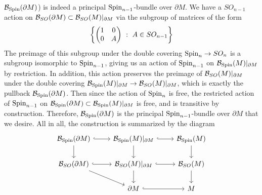 $\mathcal{B}_{\mathrm{Spin}}(\partial M)$) is indeed a principal $\mathrm{Spin}_{n-1}$-bundle over
$\partial M$. We have a $SO_{n-1}$ action on
$\mathcal{B}_{SO}(\partial M) \subset \mathcal{B}_{SO}(M)\vert_{\partial M}$ via the subgroup of
matrices of the form
\[
\left\lbrace \begin{pmatrix}
1 & 0 \\
0 & A
\end{pmatrix} ~ : ~ A \in SO_{n-1} \right\rbrace
\]
The preimage of this subgroup under the double covering $\mathrm{Spin}_n \to SO_n$ is
a subgroup isomorphic to $\mathrm{Spin}_{n-1}$, giving us an action of $\mathrm{Spin}_{n-1}$ on
$\mathcal{B}_{\mathrm{Spin}}(M)\vert_{\partial M}$ by restriction. In addition, this action
preserves the preimage of $\mathcal{B}_{SO}(M)\vert_{\partial M}$ under the double
covering $\mathcal{B}_{\mathrm{Spin}}(M)\vert_{\partial M} \to \mathcal{B}_{SO}(M)\vert_{\partial M}$,
which is exactly the pullback $\mathcal{B}_{\mathrm{Spin}}(\partial M)$. Then since the
action of $\mathrm{Spin}_n$ is free, the restricted action of $\mathrm{Spin}_{n-1}$ on
$\mathcal{B}_{\mathrm{Spin}}(\partial M) \subset \mathcal{B}_{\mathrm{Spin}}(M)\vert_{\partial M}$ is
free, and is transitive by construction. Therefore, $\mathcal{B}_{\mathrm{Spin}}(\partial M)$
is the principal $\mathrm{Spin}_{n-1}$-bundle over $\partial M$ that we desire. All in
all, the construction is summarized by the diagram
\[\begin{tikzcd}
\B_{\Spin}(\partial M) \ar[d] \ar[r, hookrightarrow] & \B_{\Spin}(M)\vert_{\partial M}
\ar[r, hookrightarrow]\ar[d] & \B_{\Spin}(M) \ar[d] \\
\B_{SO}(\partial M) \ar[r, hookrightarrow] \ar[dr] &\B_{SO}(M)\vert_{\partial M}
\ar[d] \ar[r, hookrightarrow] & \B_{SO}(M) \ar[d] \\
&\partial M \ar[r, hookrightarrow] & M
\end{tikzcd}\]
%
